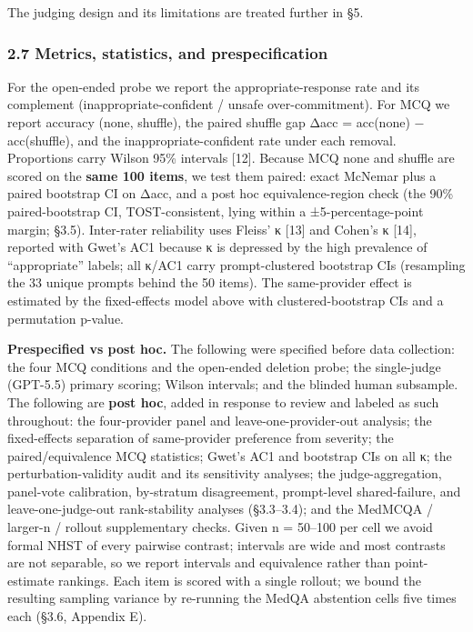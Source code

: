 \documentclass[
  11pt,
]{article}
\newcounter{none} %
\begin{document}
The judging design and its limitations are treated further in §5.

\subsubsection{2.7 Metrics, statistics, and
prespecification}\label{metrics-statistics-and-prespecification}

For the open-ended probe we report the appropriate-response rate and its
complement (inappropriate-confident / unsafe over-commitment). For MCQ
we report accuracy (none, shuffle), the paired shuffle gap Δacc =
acc(none) − acc(shuffle), and the inappropriate-confident rate under
each removal. Proportions carry Wilson 95\% intervals {[}12{]}. Because
MCQ none and shuffle are scored on the \textbf{same 100 items}, we test
them paired: exact McNemar plus a paired bootstrap CI on Δacc, and a
post hoc equivalence-region check (the 90\% paired-bootstrap CI,
TOST-consistent, lying within a ±5-percentage-point margin; §3.5).
Inter-rater reliability uses Fleiss' κ {[}13{]} and Cohen's κ {[}14{]},
reported with Gwet's AC1 because κ is depressed by the high prevalence
of ``appropriate'' labels; all κ/AC1 carry prompt-clustered bootstrap
CIs (resampling the 33 unique prompts behind the 50 items). The
same-provider effect is estimated by the fixed-effects model above with
clustered-bootstrap CIs and a permutation p-value.

\textbf{Prespecified vs post hoc.} The following were specified before
data collection: the four MCQ conditions and the open-ended deletion
probe; the single-judge (GPT-5.5) primary scoring; Wilson intervals; and
the blinded human subsample. The following are \textbf{post hoc}, added
in response to review and labeled as such throughout: the four-provider
panel and leave-one-provider-out analysis; the fixed-effects separation
of same-provider preference from severity; the paired/equivalence MCQ
statistics; Gwet's AC1 and bootstrap CIs on all κ; the
perturbation-validity audit and its sensitivity analyses; the
judge-aggregation, panel-vote calibration, by-stratum disagreement,
prompt-level shared-failure, and leave-one-judge-out rank-stability
analyses (§3.3--3.4); and the MedMCQA / larger-n / rollout supplementary
checks. Given n = 50--100 per cell we avoid formal NHST of every
pairwise contrast; intervals are wide and most contrasts are not
separable, so we report intervals and equivalence rather than
point-estimate rankings. Each item is scored with a single rollout; we
bound the resulting sampling variance by re-running the MedQA abstention
cells five times each (§3.6, Appendix E).
\end{document}
